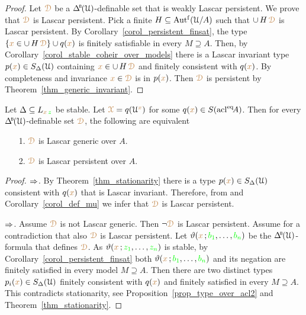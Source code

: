 \begin{proof}
  Let ${\color{brown}\EuScript D}$ be a $\BDelta(\U)$-definable set that is weakly Lascar persistent.
  We prove that ${\color{brown}\EuScript D}$ is Lascar persistent.
  Pick a finite $H\subseteq\mbox{Aut$^{\rm f}$}(\EuScript U/A)$ such that $\cup\,H\,{\color{brown}\EuScript D}$ is Lascar persistent.
  By Corollary~\ref{corol_persistent_finsat}, the type $\{{\color{brown} x}\in\cup\,H\,{\color{brown}\EuScript D}\}\cup q({\color{brown} x})$ is finitely satisfiable in every $M\supseteq A$.
  Then, by Corollary~\ref{corol_stable_coheir_over_models} there is a Lascar invariant type $p({\color{brown} x})\in S_\Delta(\EuScript U)$ containing ${\color{brown} x}\in\cup\,H\,{\color{brown}\EuScript D}$ and finitely consistent with $q({\color{brown} x})$.
  By completeness and invariance ${\color{brown} x}\in{\color{brown}\EuScript D}$ is in $p({\color{brown} x})$.
  Then ${\color{brown}\EuScript D}$ is persistent by Theorem~\ref{thm_generic_invariant}.
\end{proof}

\begin{proposition}\label{prop_stable_genericiffpersistent}
  Let $\Delta\subseteq L_{{\color{brown} x}\,{\color{green} z}}$ be stable.
  Let ${\color{brown}\EuScript X}=q(\EuScript U^{\color{brown} x})$ for some $q({\color{brown} x})\in S({\rm acl}^{{\rm eq}}\!A)$.
  Then for every $\BDelta(\U)$-definable set ${\color{brown}\EuScript D}$, the following are equivalent
  \begin{itemize}
    \item[1.] ${\color{brown}\EuScript D}$ is Lascar generic over $A$.
    \item[2.] ${\color{brown}\EuScript D}$ is Lascar persistent over $A$.
  \end{itemize}
\end{proposition}

\begin{proof}
  $\Rightarrow$.
  By Theorem~\ref{thm_stationarity} there is a type $p({\color{brown} x})\in S_\Delta(\EuScript U)$ consistent with $q({\color{brown} x})$ that is Lascar invariant.
  Therefore, from  and Corollary~\ref{corol_def_mu} we infer that ${\color{brown}\EuScript D}$ is Lascar persistent.

  $\Rightarrow$.
  Assume ${\color{brown}\EuScript D}$ is not Lascar generic.
  Then $\neg{\color{brown}\EuScript D}$ is Lascar persistent.
  Assume for a contradiction that also ${\color{brown}\EuScript D}$ is Lascar persistent.
  Let $\vartheta({\color{brown} x}\,;{\color{green} b_1},\dots,{\color{green} b_n})$ be the $\BDelta(\U)$-formula that defines ${\color{brown}\EuScript D}$.
  As $\vartheta({\color{brown} x}\,;{\color{green} z_1},\dots,{\color{green} z_n})$ is stable, by Corollary~\ref{corol_persistent_finsat} both $\vartheta({\color{brown} x}\,;{\color{green} b_1},\dots,{\color{green} b_n})$ and its negation are finitely satisfied in every model $M\supseteq A$.
  Then there are two distinct types $p_i({\color{brown} x})\in S_\Delta(\EuScript U)$ finitely consistent with $q({\color{brown} x})$ and finitely satisfied in every $M\supseteq A$.
  This contradicts stationarity, see Proposition~\ref{prop_type_over_acl2} and Theorem~\ref{thm_stationarity}.
\end{proof}

